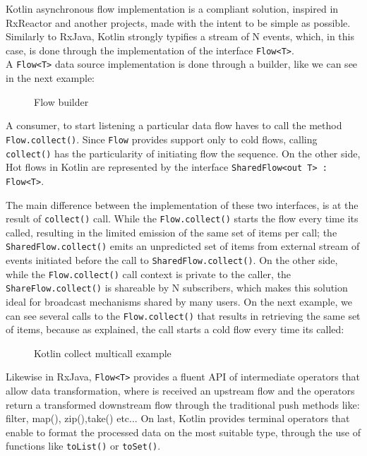 Kotlin asynchronous flow implementation is a \cite{ReactiveStreams} compliant solution, inspired in RxReactor and another projects, made with the intent to be simple as possible. Similarly to RxJava, Kotlin strongly typifies a stream of N events, which, in this case, is done through the implementation of the interface \texttt{Flow<T>}.\\
A \texttt{Flow<T>} data source implementation is done through a builder, like we can see in the next example:

\begin{figure}[H]
	\centering
	\caption{Flow builder}
	\label{fig:kotlinflow}
\end{figure}

A consumer, to start listening a particular data flow haves to call the method \texttt{Flow.collect()}. Since \texttt{Flow} provides support only to cold flows, calling \texttt{collect()} has the particularity of initiating flow the sequence.
On the other side, Hot flows in Kotlin are represented by the interface \texttt{SharedFlow<out T> : Flow<T>}. 

The main difference between the implementation of these two interfaces, is at the result of \texttt{collect()} call. 
While the \texttt{Flow.collect()} starts the flow every time its called, resulting in the limited emission of the same set of items per call; the \texttt{SharedFlow.collect()} emits an unpredicted set of items from external stream of events initiated before the call to \texttt{SharedFlow.collect()}.
On the other side, while the \texttt{Flow.collect()} call context is private to the caller, the \texttt{ShareFlow.collect()} is shareable by N subscribers, which makes this solution ideal for broadcast mechanisms shared by many users.
On the next example, we can see several calls to the \texttt{Flow.collect()} that results in retrieving the same set of items, because as explained, the call starts a cold flow every time its called:

\begin{figure}[H]
	\centering
	\caption{Kotlin collect multicall example}
	\label{fig:kotlinflowcold}
\end{figure}

Likewise in RxJava, \texttt{Flow<T>} provides a fluent API of intermediate operators that allow data transformation, where is received an upstream  flow and the operators return a transformed downstream flow through the traditional push methods like: filter, map(), zip(),take() etc... 
On last, Kotlin provides terminal operators that enable to format the processed data on the most suitable type, through the use of functions like \texttt{toList()} or \texttt{toSet()}.

